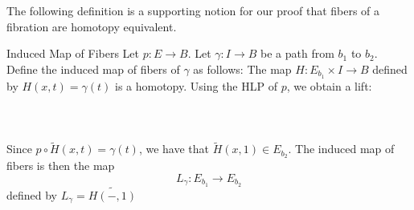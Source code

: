 \documentclass[a4paper]{article}
\begin{document}
The following definition is a supporting notion for our proof that fibers of a fibration are homotopy equivalent. 

\begin{defn}{Induced Map of Fibers}{} Let $p:E\to B$. Let $\gamma:I\to B$ be a path from $b_1$ to $b_2$. Define the induced map of fibers of $\gamma$ as follows: The map $H:E_{b_1}\times I\to B$ defined by $H(x,t)=\gamma(t)$ is a homotopy. Using the HLP of $p$, we obtain a lift: \\~\\
 \\~\\
Since $p\circ\widetilde{H}(x,t)=\gamma(t)$, we have that $\widetilde{H}(x,1)\in E_{b_2}$. The induced map of fibers is then the map $$L_\gamma:E_{b_1}\to E_{b_2}$$ defined by $L_\gamma=\widetilde{H(-,1)}$
\end{defn}
\end{document}
